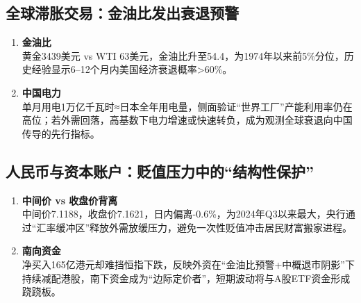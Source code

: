 \subsection{全球滞胀交易：金油比发出衰退预警}
\begin{enumerate}[leftmargin=*, nosep]
    \item \textbf{金油比}  \\
    黄金3439美元 vs WTI 63美元，金油比升至54.4，为1974年以来前5\%分位，历史经验显示6–12个月内美国经济衰退概率>60\%。  
    \item \textbf{中国电力}  \\
    单月用电1万亿千瓦时≈日本全年用电量，侧面验证“世界工厂”产能利用率仍在高位；若外需回落，高基数下电力增速或快速转负，成为观测全球衰退向中国传导的先行指标。
\end{enumerate}

\subsection{人民币与资本账户：贬值压力中的“结构性保护”}
\begin{enumerate}[leftmargin=*, nosep]
    \item \textbf{中间价 vs 收盘价背离}  \\
    中间价7.1188，收盘价7.1621，日内偏离-0.6\%，为2024年Q3以来最大，央行通过“汇率缓冲区”释放外需放缓压力，避免一次性贬值冲击居民财富搬家进程。  
    \item \textbf{南向资金}  \\
    净买入165亿港元却难挡恒指下跌，反映外资在“金油比预警+中概退市阴影”下持续减配港股，南下资金成为“边际定价者”，短期波动将与A股ETF资金形成跷跷板。
\end{enumerate}